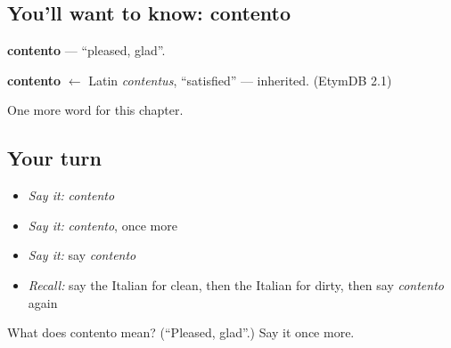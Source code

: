 \subsection*{You'll want to know: contento}
\textbf{contento} — \textquotedblleft{}pleased, glad\textquotedblright{}.

\begin{cousinweb}
\textbf{contento} $\leftarrow$ Latin \emph{contentus}, \textquotedblleft{}satisfied\textquotedblright{} — inherited. (EtymDB 2.1)
\end{cousinweb}

\begin{grammarlens}[title={What you've built}]
One more word for this chapter.
\end{grammarlens}

\subsection*{Your turn}
\begin{itemize}
\raggedright
  \item \emph{Say it:} \emph{contento}
  \item \emph{Say it:} \emph{contento}, once more
  \item \emph{Say it:} say \emph{contento}
  \item \emph{Recall:} say the Italian for clean, then the Italian for dirty, then say \emph{contento} again
\end{itemize}

\begin{tcolorbox}[breakable,colback=teal!4,colframe=teal!35!black,title={Before you move on}]
What does contento mean? (\textquotedblleft{}Pleased, glad\textquotedblright{}.) Say it once more.
\end{tcolorbox}
